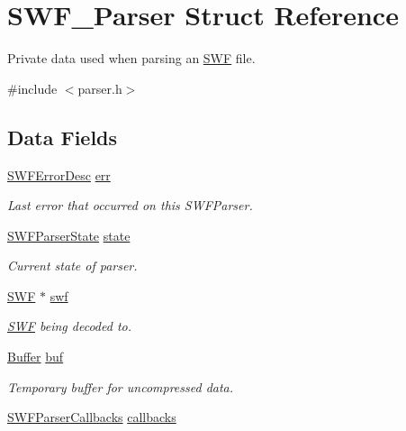 \hypertarget{struct_s_w_f___parser}{\section{S\-W\-F\-\_\-\-Parser Struct Reference}
\label{struct_s_w_f___parser}
}


Private data used when parsing an \hyperlink{struct_s_w_f}{S\-W\-F} file.  




{\ttfamily \#include $<$parser.\-h$>$}

\subsection*{Data Fields}
\begin{DoxyCompactItemize}
\item 
\hyperlink{struct_s_w_f_error_desc}{S\-W\-F\-Error\-Desc} \hyperlink{struct_s_w_f___parser_a228c1268386d125a52e25b11f576a60d}{err}
\begin{DoxyCompactList}\small\item\em Last error that occurred on this S\-W\-F\-Parser. \end{DoxyCompactList}\item 
\hyperlink{parser_8h_a2d847bc5fa348d069da8cea188ca5248}{S\-W\-F\-Parser\-State} \hyperlink{struct_s_w_f___parser_aeebc37448b1cdf66f228a06a53c483e9}{state}
\begin{DoxyCompactList}\small\item\em Current state of parser. \end{DoxyCompactList}\item 
\hyperlink{struct_s_w_f}{S\-W\-F} $\ast$ \hyperlink{struct_s_w_f___parser_a89022933c95956b746307de9714197da}{swf}
\begin{DoxyCompactList}\small\item\em \hyperlink{struct_s_w_f}{S\-W\-F} being decoded to. \end{DoxyCompactList}\item 
\hyperlink{struct_buffer}{Buffer} \hyperlink{struct_s_w_f___parser_aee4f16e3f852e7ac2e0eeac8795a15cf}{buf}
\begin{DoxyCompactList}\small\item\em Temporary buffer for uncompressed data. \end{DoxyCompactList}\item 
\hyperlink{struct_s_w_f_parser_callbacks}{S\-W\-F\-Parser\-Callbacks} \hyperlink{struct_s_w_f___parser_a7ac999619795fa6e6bb4132af080eae6}{callbacks}

\end{DoxyCompactItemize}
